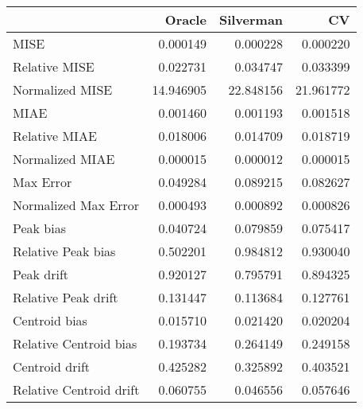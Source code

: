 \begin{tabular}{lrrr}
  \hline
 & Oracle & Silverman & CV \\ 
  \hline
MISE & 0.000149 & 0.000228 & 0.000220 \\ 
  Relative MISE & 0.022731 & 0.034747 & 0.033399 \\ 
  Normalized MISE & 14.946905 & 22.848156 & 21.961772 \\ 
  MIAE & 0.001460 & 0.001193 & 0.001518 \\ 
  Relative MIAE & 0.018006 & 0.014709 & 0.018719 \\ 
  Normalized MIAE & 0.000015 & 0.000012 & 0.000015 \\ 
  Max Error & 0.049284 & 0.089215 & 0.082627 \\ 
  Normalized Max Error & 0.000493 & 0.000892 & 0.000826 \\ 
  Peak bias & 0.040724 & 0.079859 & 0.075417 \\ 
  Relative Peak bias & 0.502201 & 0.984812 & 0.930040 \\ 
  Peak drift & 0.920127 & 0.795791 & 0.894325 \\ 
  Relative Peak drift & 0.131447 & 0.113684 & 0.127761 \\ 
  Centroid bias & 0.015710 & 0.021420 & 0.020204 \\ 
  Relative Centroid bias & 0.193734 & 0.264149 & 0.249158 \\ 
  Centroid drift & 0.425282 & 0.325892 & 0.403521 \\ 
  Relative Centroid drift & 0.060755 & 0.046556 & 0.057646 \\ 
   \hline
\end{tabular}
